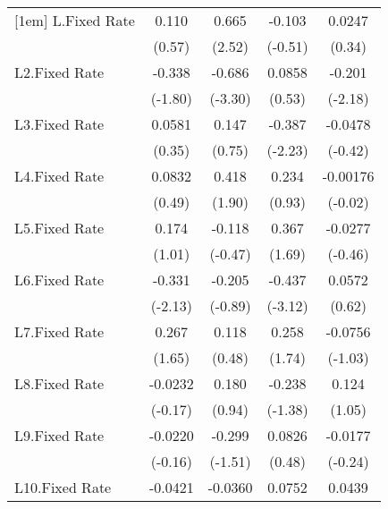 {\begin{longtable}{l*{4}{c}}
[1em]
L.Fixed Rate    &    0.110         &    0.665\sym{*}  &   -0.103         &   0.0247         \\
                &   (0.57)         &   (2.52)         &  (-0.51)         &   (0.34)         \\
[1em]
L2.Fixed Rate   &   -0.338         &   -0.686\sym{***}&   0.0858         &   -0.201\sym{*}  \\
                &  (-1.80)         &  (-3.30)         &   (0.53)         &  (-2.18)         \\
[1em]
L3.Fixed Rate   &   0.0581         &    0.147         &   -0.387\sym{*}  &  -0.0478         \\
                &   (0.35)         &   (0.75)         &  (-2.23)         &  (-0.42)         \\
[1em]
L4.Fixed Rate   &   0.0832         &    0.418         &    0.234         & -0.00176         \\
                &   (0.49)         &   (1.90)         &   (0.93)         &  (-0.02)         \\
[1em]
L5.Fixed Rate   &    0.174         &   -0.118         &    0.367         &  -0.0277         \\
                &   (1.01)         &  (-0.47)         &   (1.69)         &  (-0.46)         \\
[1em]
L6.Fixed Rate   &   -0.331\sym{*}  &   -0.205         &   -0.437\sym{**} &   0.0572         \\
                &  (-2.13)         &  (-0.89)         &  (-3.12)         &   (0.62)         \\
[1em]
L7.Fixed Rate   &    0.267         &    0.118         &    0.258         &  -0.0756         \\
                &   (1.65)         &   (0.48)         &   (1.74)         &  (-1.03)         \\
[1em]
L8.Fixed Rate   &  -0.0232         &    0.180         &   -0.238         &    0.124         \\
                &  (-0.17)         &   (0.94)         &  (-1.38)         &   (1.05)         \\
[1em]
L9.Fixed Rate   &  -0.0220         &   -0.299         &   0.0826         &  -0.0177         \\
                &  (-0.16)         &  (-1.51)         &   (0.48)         &  (-0.24)         \\
[1em]
L10.Fixed Rate  &  -0.0421         &  -0.0360         &   0.0752         &   0.0439         \\

\end{longtable}}
